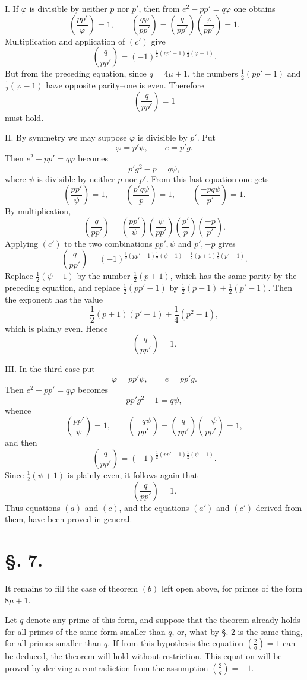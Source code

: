 \documentclass[11pt]{article}
\newcommand{\J}[2]{\left(\frac{#1}{#2}\right)}
\begin{document}
I. If $\varphi$ is divisible by neither $p$ nor $p'$, then from $e^2-pp'=q\varphi$ one obtains
\[
 \J{pp'}{\varphi}=1,
\qquad
 \J{q\varphi}{pp'}=\J{q}{pp'}\J{\varphi}{pp'}=1.
\]
Multiplication and application of $(c')$ give
\[
 \J{q}{pp'}=(-1)^{\frac12(pp'-1)\frac12(\varphi-1)}.
\]
But from the preceding equation, since $q=4\mu+1$, the numbers $\frac12(pp'-1)$ and $\frac12(\varphi-1)$ have opposite parity--one is even. Therefore
\[
 \J{q}{pp'}=1
\]
must hold.

II. By symmetry we may suppose $\varphi$ is divisible by $p'$. Put
\[
 \varphi=p'\psi,
\qquad e=p'g.
\]
Then $e^2-pp'=q\varphi$ becomes
\[
 p'g^2-p=q\psi,
\]
where $\psi$ is divisible by neither $p$ nor $p'$. From this last equation one gets
\[
 \J{pp'}{\psi}=1,
\qquad
 \J{p'q\psi}{p}=1,
\qquad
 \J{-p q\psi}{p'}=1.
\]
By multiplication,
\[
 \J{q}{pp'}=\J{pp'}{\psi}\J{\psi}{pp'}\J{p'}{p}\J{-p}{p'}.
\]
Applying $(c')$ to the two combinations $pp',\psi$ and $p',-p$ gives
\[
 \J{q}{pp'}=(-1)^{\frac12(pp'-1)\frac12(\psi-1)+\frac12(p+1)\frac12(p'-1)}.
\]
Replace $\frac12(\psi-1)$ by the number $\frac12(p+1)$, which has the same parity by the preceding equation, and replace $\frac12(pp'-1)$ by $\frac12(p-1)+\frac12(p'-1)$. Then the exponent has the value
\[
 \frac12(p+1)(p'-1)+\frac14(p^2-1),
\]
which is plainly even. Hence
\[
 \J{q}{pp'}=1.
\]

III. In the third case put
\[
 \varphi=pp'\psi,
\qquad e=pp'g.
\]
Then $e^2-pp'=q\varphi$ becomes
\[
 pp'g^2-1=q\psi,
\]
whence
\[
 \J{pp'}{\psi}=1,
\qquad
 \J{-q\psi}{pp'}=\J{q}{pp'}\J{-\psi}{pp'}=1,
\]
and then
\[
 \J{q}{pp'}=(-1)^{\frac12(pp'-1)\frac12(\psi+1)}.
\]
Since $\frac12(\psi+1)$ is plainly even, it follows again that
\[
 \J{q}{pp'}=1.
\]
Thus equations $(a)$ and $(c)$, and the equations $(a')$ and $(c')$ derived from them, have been proved in general.

\section*{\S. 7.}

It remains to fill the case of theorem $(b)$ left open above, for primes of the form $8\mu+1$.

Let $q$ denote any prime of this form, and suppose that the theorem already holds for all primes of the same form smaller than $q$, or, what by \S. 2 is the same thing, for all primes smaller than $q$. If from this hypothesis the equation $\J{2}{q}=1$ can be deduced, the theorem will hold without restriction. This equation will be proved by deriving a contradiction from the assumption $\J{2}{q}=-1$.
\end{document}
